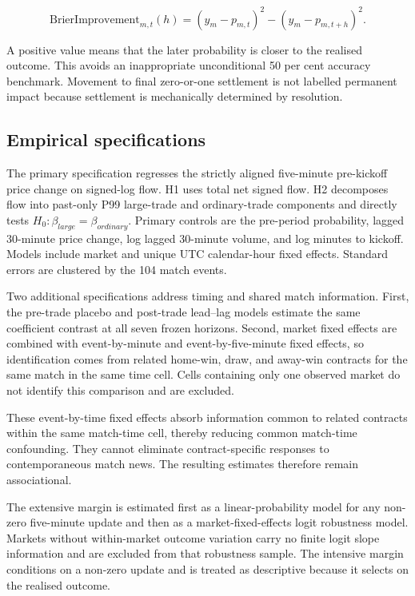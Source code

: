 \begin{equation}
  \text{BrierImprovement}_{m,t}(h)=
  (y_m-p_{m,t})^2-(y_m-p_{m,t+h})^2.
\end{equation}

A positive value means that the later probability is closer to the realised outcome. This avoids an inappropriate unconditional 50 per cent accuracy benchmark. Movement to final zero-or-one settlement is not labelled permanent impact because settlement is mechanically determined by resolution.

\subsection{Empirical specifications}

The primary specification regresses the strictly aligned five-minute
pre-kickoff price change on signed-log flow. H1 uses total net signed flow. H2
decomposes flow into past-only P99 large-trade and ordinary-trade components and
directly tests $H_0:\beta_{large}=\beta_{ordinary}$. Primary controls are the
pre-period probability, lagged 30-minute price change, log lagged 30-minute
volume, and log minutes to kickoff. Models include market and unique UTC
calendar-hour fixed effects. Standard errors are clustered by the 104 match
events.

Two additional specifications address timing and shared match information.
First, the pre-trade placebo and post-trade lead--lag models estimate the same
coefficient contrast at all seven frozen horizons. Second, market fixed effects
are combined with event-by-minute and event-by-five-minute fixed effects, so
identification comes from related home-win, draw, and away-win contracts for the
same match in the same time cell. Cells containing only one observed market do
not identify this comparison and are excluded.

These event-by-time fixed effects absorb information common to related
contracts within the same match-time cell, thereby reducing common match-time
confounding. They cannot eliminate contract-specific responses to
contemporaneous match news. The resulting estimates therefore remain
associational.

The extensive margin is estimated first as a linear-probability model for any
non-zero five-minute update and then as a market-fixed-effects logit robustness
model. Markets without within-market outcome variation carry no finite logit
slope information and are excluded from that robustness sample. The intensive
margin conditions on a non-zero update and is treated as descriptive because it
selects on the realised outcome.

